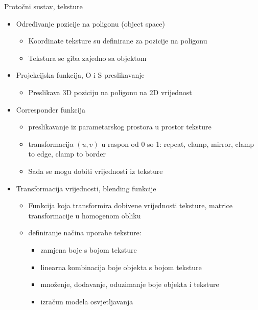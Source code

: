 \documentclass[9pt]{beamer}
\begin{document}
\begin{frame}{Protočni sustav, teksture}
	\begin{itemize}
		\item Određivanje pozicije na poligonu (object space)
		\begin{itemize}
			\item Koordinate teksture su definirane za pozicije na poligonu
			\item Tekstura se giba zajedno sa  objektom 
		\end{itemize}
		\item Projekcijska funkcija, O i S preslikavanje
		\begin{itemize}
			\item Preslikava 3D poziciju na poligonu na 2D vrijednost 
		\end{itemize}
		\item Corresponder funkcija
		\begin{itemize}
			\item preslikavanje iz parametarskog prostora u prostor teksture
			\item  transformacija $(u, v)$ u raspon od 0 so 1: repeat, clamp, mirror, clamp to edge, clamp to border
			\item Sada se mogu dobiti vrijednosti iz teksture
		\end{itemize}
		\item Transformacija vrijednosti, blending funkcije
		\begin{itemize}
			\item Funkcija koja transformira dobivene vrijednosti teksture, matrice transformacije u homogenom obliku
			\item definiranje načina uporabe teksture:
			\begin{itemize}
				\item zamjena boje s bojom teksture
				\item linearna kombinacija boje objekta s bojom teksture
				\item množenje, dodavanje, oduzimanje boje objekta i teksture
				\item izračun modela osvjetljavanja
			\end{itemize}
		\end{itemize}
	\end{itemize}
\end{frame}
\end{document}
